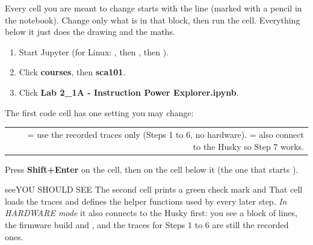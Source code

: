 \documentclass[11pt,letterpaper]{article}
\begin{document}
\vspace{4pt}

Every cell you are meant to change starts with the line \textbf{} (marked with a pencil in the
notebook). Change only what is in that block, then run the cell. Everything below it just does the drawing and the
maths.

\Needspace{288pt}



\begin{enumerate}[label=\arabic*.,leftmargin=1.8em,itemsep=2pt,topsep=2pt,parsep=0pt,start=1]
\item Start Jupyter (for Linux: , then , then ).
\item Click \textbf{courses}, then \textbf{sca101}.
\item Click \textbf{Lab 2\_1A - Instruction Power Explorer.ipynb}.
\end{enumerate}

\vspace{4pt}


The first code cell has one setting you may change:

{\small{}
\begin{longtable}{|R{0.2391}|R{0.1522}|R{0.6087}|}
\hline
{} &  &  \\ \hline
\endhead
{} &  &  = use the recorded traces only (Steps 1 to 6, no hardware).  = also connect to the Husky so Step 7 works. \\ \hline
\end{longtable}}

\vspace{4pt}


Press \textbf{Shift+Enter} on the  cell, then on the cell below it (the one that starts
).

\begin{guidecallout}{see}{YOU SHOULD SEE}
The second cell prints a green check mark and  That
cell loads the traces and defines the helper functions used by every later step. \emph{In HARDWARE mode} it also
connects to the Husky first: you see a block of  lines, the firmware build and , and the traces for
Steps 1 to 6 are still the recorded ones.
\end{guidecallout}
\end{document}
